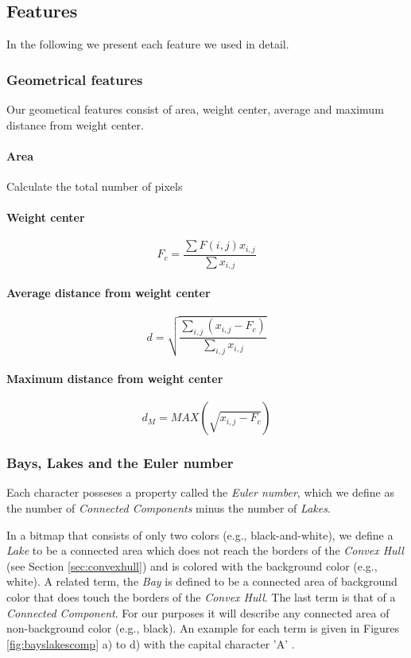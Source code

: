 \documentclass{article}
\begin{document}
\subsection{Features}
In the following we present each feature we used in detail.

\subsubsection{Geometrical features}
\label{sec:geometrical}
Our geometical features consist of area, weight center, average and maximum distance from weight center.
\paragraph{Area}
Calculate the total number of pixels

\paragraph{Weight center}
\begin{equation}
F_c=\frac{\sum F(i,j)x_{i,j}}{\sum x_{i,j}}
\end{equation}

\paragraph{Average distance from weight center}
\begin{equation}
d = \sqrt{\frac{\sum_{i,j}(x_{i,j} - F_c)}{\sum_{i,j}x_{i,j}}}
\end{equation}

\paragraph{Maximum distance from weight center}
\begin{equation}
	d_M = MAX(\sqrt{x_{i,j}-F_c})
\end{equation}

\subsubsection{Bays, Lakes and the Euler number}
\label{sec:lakeseuler}
Each character posseses a property called the \textit{Euler number}, which we define as the number of \textit{Connected Components} minus the number of \textit{Lakes}.

In a bitmap that consists of only two colors (e.g., black-and-white), we define a \textit{Lake} to be a connected area which does not reach the borders of the \textit{Convex Hull} (see Section \ref{sec:convexhull}) and is colored with the background color (e.g., white). A related term, the \textit{Bay} is defined to be a connected area of background color that does touch the borders of the \textit{Convex Hull}. The last term is that of a \textit{Connected Component}. For our purposes it will describe any connected area of non-background color (e.g., black). An example for each term is given in Figures \ref{fig:bayslakescomp} a) to d) with the capital character 'A' .
\end{document}
